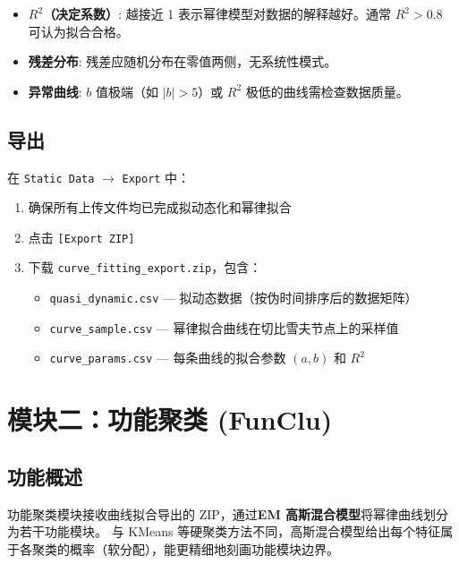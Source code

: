 \documentclass[12pt,a4paper]{ctexart}
\newcommand{\btn}[1]{\texttt{[#1]}}
\newcommand{\tab}[1]{\texttt{#1}}
\newcommand{\file}[1]{\texttt{#1}}
\begin{document}
\begin{itemize}[leftmargin=*]
    \item \textbf{$R^2$（决定系数）}: 越接近 1 表示幂律模型对数据的解释越好。通常 $R^2 > 0.8$ 可认为拟合合格。
    \item \textbf{残差分布}: 残差应随机分布在零值两侧，无系统性模式。
    \item \textbf{异常曲线}: $b$ 值极端（如 $|b| > 5$）或 $R^2$ 极低的曲线需检查数据质量。
\end{itemize}

\subsection{导出}

在 \tab{Static Data} $\rightarrow$ \tab{Export} 中：
\begin{enumerate}[leftmargin=*]
    \item 确保所有上传文件均已完成拟动态化和幂律拟合
    \item 点击 \btn{Export ZIP}
    \item 下载 \file{curve\_fitting\_export.zip}，包含：
    \begin{itemize}
        \item \file{quasi\_dynamic.csv} --- 拟动态数据（按伪时间排序后的数据矩阵）
        \item \file{curve\_sample.csv} --- 幂律拟合曲线在切比雪夫节点上的采样值
        \item \file{curve\_params.csv} --- 每条曲线的拟合参数 $(a, b)$ 和 $R^2$
    \end{itemize}
\end{enumerate}

\section{模块二：功能聚类 (FunClu)}

\subsection{功能概述}

功能聚类模块接收曲线拟合导出的 ZIP，通过\textbf{EM 高斯混合模型}将幂律曲线划分为若干功能模块。
与 KMeans 等硬聚类方法不同，高斯混合模型给出每个特征属于各聚类的概率（软分配），能更精细地刻画功能模块边界。
\end{document}
